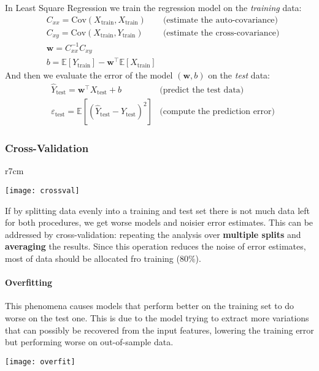 \begin{example}
	In Least Square Regression we train the regression model on the \textit{training} data:
	\begin{align*}
		& C_{xx} = \text{Cov}(X_\text{train}, X_\text{train}) & \text{(estimate the auto-covariance)} \\
		& C_{xy} = \text{Cov}(X_\text{train}, Y_\text{train}) & \text{(estimate the cross-covariance)} \\
		& \mathbf{w} = C^{-1}_{xx}C_{xy} \\
		&b = \mathbb{E}[Y_\text{train}] - \mathbf{w}^\top \mathbb{E}[X_\text{train}]
	\end{align*}
	And then we evaluate the error of the model $(\mathbf{w}, b)$ on the \textit{test} data:
	\begin{align*}
		& \hat{Y}_\text{test} = \mathbf{w}^\top X_\text{test} + b & \text{(predict the test data)} \\
		& \varepsilon_\text{test} = \mathbb{E}[(\hat{Y}_\text{test}-Y_\text{test})^2] & \text{(compute the prediction error)}
	\end{align*}
\end{example}

\newpage
\subsubsection{Cross-Validation}
\begin{wrapfigure}[7]{r}{7cm}
	\vspace{-.9cm}
	\begin{center}
		\texttt{[image: crossval]}
	\end{center}
\end{wrapfigure}
If by splitting data evenly into a training and test set there is not much data left for both procedures, we get worse models and noisier error estimates. This can be addressed by cross-validation: repeating the analysis over \textbf{multiple splits} and \textbf{averaging} the results. Since this operation reduces the noise of error estimates, most of data should be allocated fro training ($80\%$).

\paragraph{Overfitting} This phenomena causes models that perform better on the training set to do worse on the test one. This is due to the model trying to extract more variations that can possibly be recovered from the input features, lowering the training error but performing worse on out-of-sample data.
\begin{center}
	\texttt{[image: overfit]}
\end{center}

